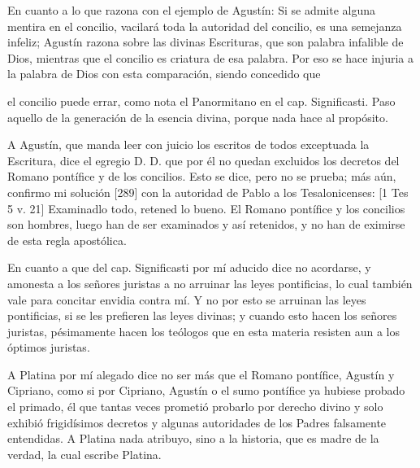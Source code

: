 En cuanto a lo que razona con el ejemplo de Agustín: Si se admite alguna mentira en el concilio, vacilará toda la autoridad del concilio, es una semejanza infeliz; Agustín razona sobre las divinas Escrituras, que son palabra infalible de Dios, mientras que el concilio es criatura de esa palabra. Por eso se hace injuria a la palabra de Dios con esta comparación, siendo concedido que

el concilio puede errar, como nota el Panormitano en el cap. Significasti. Paso aquello de la generación de la esencia divina, porque nada hace al propósito.

A Agustín, que manda leer con juicio los escritos de todos exceptuada la Escritura, dice el egregio D. D. que por él no quedan excluidos los decretos del Romano pontífice y de los concilios. Esto se dice, pero no se prueba; más aún, confirmo mi solución [289] con la autoridad de Pablo a los Tesalonicenses: [1 Tes 5 v. 21] Examinadlo todo, retened lo bueno. El Romano pontífice y los concilios son hombres, luego han de ser examinados y así retenidos, y no han de eximirse de esta regla apostólica.

En cuanto a que del cap. Significasti por mí aducido dice no acordarse, y amonesta a los señores juristas a no arruinar las leyes pontificias, lo cual también vale para concitar envidia contra mí. Y no por esto se arruinan las leyes pontificias, si se les prefieren las leyes divinas; y cuando esto hacen los señores juristas, pésimamente hacen los teólogos que en esta materia resisten aun a los óptimos juristas.

A Platina por mí alegado dice no ser más que el Romano pontífice, Agustín y Cipriano, como si por Cipriano, Agustín o el sumo pontífice ya hubiese probado el primado, él que tantas veces prometió probarlo por derecho divino y solo exhibió frigidísimos decretos y algunas autoridades de los Padres falsamente entendidas. A Platina nada atribuyo, sino a la historia, que es madre de la verdad, la cual escribe Platina.

